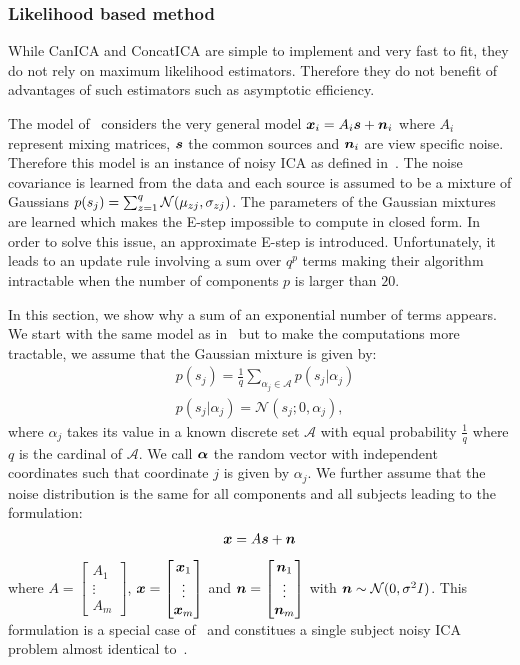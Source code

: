 \subsubsection{Likelihood based method}
\label{sec:guo}
While CanICA and ConcatICA are simple to implement and very fast to fit, they do
not rely on maximum likelihood estimators. Therefore they do not benefit of
advantages of such estimators such as asymptotic efficiency.

The model of~\cite{guo2008unified} considers the very general model $\boldsymbol{x}_i =
A_i\boldsymbol{s} + \boldsymbol{n}_i$ where
$A_i$ represent mixing matrices, $\boldsymbol{s}$ the common sources and $\boldsymbol{n}_i$ are view
specific noise. Therefore this model is an instance of noisy ICA as defined
in~\cite{hyvarinen1999Gaussian}. The noise covariance is learned from the data
and each source is assumed to be a mixture of Gaussians
$p(s_j) = \sum_{z=1}^q \mathcal{N}(\mu_{zj}, \sigma_{zj})$. The parameters of the
Gaussian mixtures are learned which makes the E-step impossible to compute in closed form.
In order to solve this issue, an approximate E-step is introduced.
Unfortunately, it leads to an update rule involving a sum over $q^p$ terms making their algorithm intractable when the number of components $p$ is larger than $20$. 

In this section, we show why a sum of an exponential number of terms appears.
We start with the same model as in~\cite{guo2008unified} but to make the
computations more tractable, we assume that the Gaussian mixture is given by:
\begin{align}
  &p(s_j) = \frac1q \sum_{\alpha_j \in \mathcal{A}} p(s_j | \alpha_j) \\
  &p(s_j | \alpha_j) = \mathcal{N}( s_j; 0, \alpha_j),
\end{align}
where $\alpha_j$ takes its value in a known
discrete set $\mathcal{A}$ with equal probability $\frac1{q}$ where $q$ is the
cardinal of $\mathcal{A}$.
We call $\boldsymbol{\alpha}$ the random vector with
independent coordinates such that coordinate $j$ is given by $\alpha_j$.
We further assume that the noise distribution is the same for all components and
all subjects leading to the formulation:
\begin{align}
  \boldsymbol{x} = A \boldsymbol{s} + \boldsymbol{n}
\end{align}
where $A = \begin{bmatrix} A_1 \\ \vdots  \\ A_m \end{bmatrix}$,
$\boldsymbol{x} = \begin{bmatrix} \boldsymbol{x}_1 \\ \vdots  \\ \boldsymbol{x}_m \end{bmatrix}$ and $\boldsymbol{n}
= \begin{bmatrix} \boldsymbol{n}_1 \\ \vdots  \\ \boldsymbol{n}_m \end{bmatrix}$ with $\boldsymbol{n} \sim \mathcal{N}(0, \sigma^2 I)$.
This formulation is a special case of~\cite{guo2008unified} and constitues a single subject
noisy ICA problem almost identical to~\cite{moulines1997maximum}.


